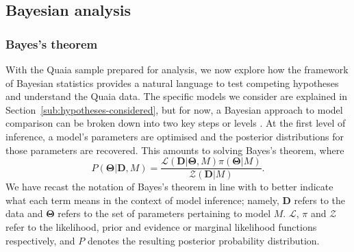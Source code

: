 \documentclass[fleqn,usenatbib]{mnras}
\begin{document}
        \subsection{Bayesian analysis}
        \label{sub:bayesian-methods}    
        \subsubsection{Bayes's theorem}
            With the Quaia sample prepared for analysis, we now explore how the framework of Bayesian statistics provides a natural language to test competing hypotheses and understand the Quaia data.
            The specific models we consider are explained in Section~\ref{sub:hypotheses-considered}, but for now, a Bayesian approach to model comparison can be broken down into two key steps or levels \citep{mackay2003}.
            At the first level of inference, a model's parameters are optimised and the posterior distributions for those parameters are recovered.
            This amounts to solving Bayes's theorem, where
            \begin{equation}
                P( \mathbf{\Theta} | \mathbf{D}, M ) = \frac{\mathcal{L}(\mathbf{D} | \mathbf{\Theta}, M) \pi(\mathbf{\Theta} | M)}{\mathcal{Z}(\mathbf{D} | M)}. \label{eq:bayes-theorem}
            \end{equation}
            We have recast the notation of Bayes's theorem in line with \citet{speagle2020} to better indicate what each term means in the context of model inference; namely, $\mathbf{D}$ refers to the data and $\mathbf{\Theta}$ refers to the set of parameters pertaining to model $M$.
            $\mathcal{L}$, $\pi$ and $\mathcal{Z}$ refer to the likelihood, prior and evidence or marginal likelihood functions respectively, and $P$ denotes the resulting posterior probability distribution.
        
\end{document}
